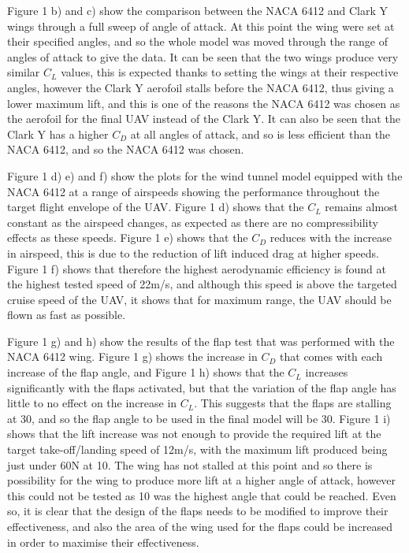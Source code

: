 \documentclass[../../main.tex]{subfiles}
\begin{document}
Figure 1 b) and c) show the comparison between the NACA 6412 and Clark Y wings through a full sweep of angle of attack.
At this point the wing were set at their specified angles, and so the whole model was moved through the range of angles of attack to give the data.
It can be seen that the two wings produce very similar $C_L$ values, this is expected thanks to setting the wings at their respective angles, however the Clark Y aerofoil stalls before the NACA 6412, thus giving a lower maximum lift, and this is one of the reasons the NACA 6412 was chosen as the aerofoil for the final UAV instead of the Clark Y.
It can also be seen that the Clark Y has a higher $C_D$ at all angles of attack, and so is less efficient than the NACA 6412, and so the NACA 6412 was chosen. 

Figure 1 d) e) and f) show the plots for the wind tunnel model equipped with the NACA 6412 at a range of airspeeds showing the performance throughout the target flight envelope of the UAV.
Figure 1 d) shows that the $C_L$ remains almost constant as the airspeed changes, as expected as there are no compressibility effects as these speeds.
Figure 1 e) shows that the $C_D$ reduces with the increase in airspeed, this is due to the reduction of lift induced drag at higher speeds.
Figure 1 f) shows that therefore the highest aerodynamic efficiency is found at the highest tested speed of 22m/s, and although this speed is above the targeted cruise speed of the UAV, it shows that for maximum range, the UAV should be flown as fast as possible. 

Figure 1 g) and h) show the results of the flap test that was performed with the NACA 6412 wing.
Figure 1 g) shows the increase in $C_D$ that comes with each increase of the flap angle, and Figure 1 h) shows that the $C_L$ increases significantly with the flaps activated, but that the variation of the flap angle has little to no effect on the increase in $C_L$.
This suggests that the flaps are stalling at 30, and so the flap angle to be used in the final model will be 30.
Figure 1 i) shows that the lift increase was not enough to provide the required lift at the target take-off/landing speed of 12m/s, with the maximum lift produced being just under 60N at 10.
The wing has not stalled at this point and so there is possibility for the wing to produce more lift at a higher angle of attack, however this could not be tested as 10 was the highest angle that could be reached.
Even so, it is clear that the design of the flaps needs to be modified to improve their effectiveness, and also the area of the wing used for the flaps could be increased in order to maximise their effectiveness. 
\end{document}
